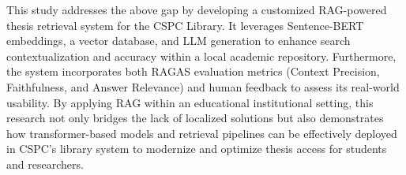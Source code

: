 \begin{refsection}
\hspace{1cm}This study addresses the above gap by developing a customized RAG-powered thesis retrieval system for the CSPC Library. It leverages Sentence-BERT embeddings, a vector database, and LLM generation to enhance search contextualization and accuracy within a local academic repository. Furthermore, the system incorporates both RAGAS evaluation metrics (Context Precision, Faithfulness, and Answer Relevance) and human feedback to assess its real-world usability. By applying RAG within an educational institutional setting, this research not only bridges the lack of localized solutions but also demonstrates how transformer-based models and retrieval pipelines can be effectively deployed in CSPC’s library system to modernize and optimize thesis access for students and researchers.



\clearpage

\printbibliography[heading=subbibintoc, title={\centering Notes}]
\end{refsection}